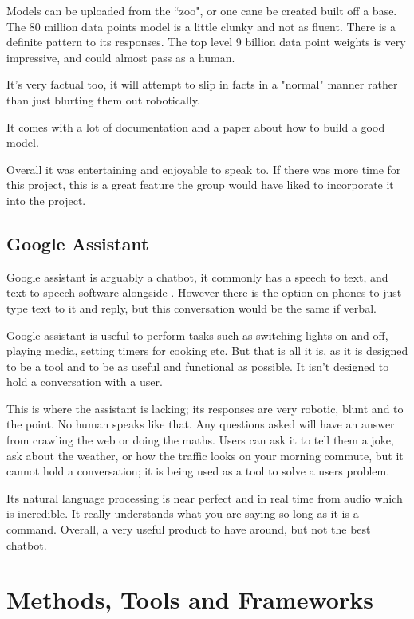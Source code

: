 \documentclass[11pt]{article}
\begin{document}
	Models can be uploaded from the ``zoo", or one cane be created built off a base. The 80 million data points model is a little clunky and not as fluent. There is a definite pattern to its responses. The top level 9 billion data point weights is very impressive, and could almost pass as a human. 
	
	It's very factual too, it will attempt to slip in facts in a "normal" manner rather than just blurting them out robotically. 
	
	It comes with a lot of documentation and a paper about how to build a good model. 
	
	Overall it was entertaining and enjoyable to speak to. If there was more time for this project, this is a great feature the group would have liked to incorporate it into the project.
	
	\subsection{Google Assistant}
	Google assistant is arguably a chatbot, it commonly has a speech to text, and text to speech software alongside \citet{Google Assistant}. However there is the option on phones to just type text to it and reply, but this conversation would be the same if verbal.
	
	Google assistant is useful to perform tasks such as switching lights on and off, playing media, setting timers for cooking etc. But that is all it is, as it is designed to be a tool and to be as useful and functional as possible. It isn't designed to hold a conversation with a user. 
	
	This is where the assistant is lacking; its responses are very robotic, blunt and to the point. No human speaks like that. Any questions asked will have an answer from crawling the web or doing the maths. Users can ask it to tell them a joke, ask about the weather, or how the traffic looks on your morning commute, but it cannot hold a conversation; it is being used as a tool to solve a users problem.
	
	Its natural language processing is near perfect and in real time from audio which is incredible. It really understands what you are saying so long as it is a command. Overall, a very useful product to have around, but not the best chatbot.	
	
	\section{Methods, Tools and Frameworks} \label{Methods}
	     
\end{document}
